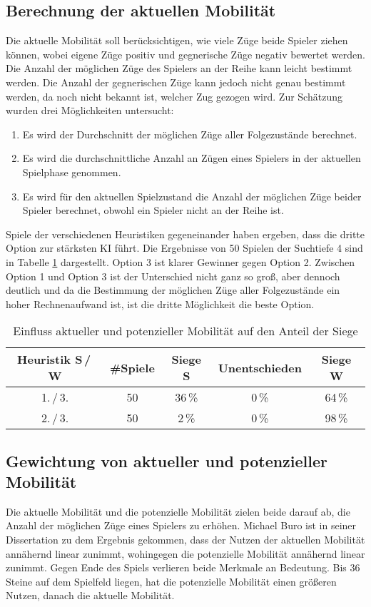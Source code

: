 \subsection{Berechnung der aktuellen Mobilität}
\label{sec:currentmobility}
Die aktuelle Mobilität soll berücksichtigen, wie viele Züge beide Spieler ziehen können, wobei eigene Züge positiv und
gegnerische Züge negativ bewertet werden. Die Anzahl der möglichen Züge des Spielers an der Reihe kann leicht bestimmt
werden. Die Anzahl der gegnerischen Züge kann jedoch nicht genau bestimmt werden, da noch nicht bekannt ist, welcher Zug
gezogen wird. Zur Schätzung wurden drei Möglichkeiten untersucht:
\begin{enumerate}
    \item Es wird der Durchschnitt der möglichen Züge aller Folgezustände berechnet.
    \item Es wird die durchschnittliche Anzahl an Zügen eines Spielers in der aktuellen Spielphase genommen.
    \item Es wird für den aktuellen Spielzustand die Anzahl der möglichen Züge beider Spieler berechnet, obwohl ein
    Spieler nicht an der Reihe ist.
\end{enumerate}
Spiele der verschiedenen Heuristiken gegeneinander haben ergeben, dass die dritte Option zur stärksten \ac{KI} führt. Die
Ergebnisse von 50 Spielen der Suchtiefe 4 sind in Tabelle \ref{table:currentmobility} dargestellt. Option 3 ist klarer
Gewinner gegen Option 2. Zwischen Option 1 und Option 3 ist der Unterschied nicht ganz so groß, aber dennoch deutlich
und da die Bestimmung der möglichen Züge aller Folgezustände ein hoher Rechnenaufwand ist, ist die dritte Möglichkeit
die beste Option.

\begin{table}[hb]
\centering
\begin{tabular}{c|c|ccc}
\hline
Heuristik S\,/\,W & \#Spiele & Siege S & Unentschieden & Siege W \\
\hline
 1.\,/\,3. & 50 & 36\,\% &  0\,\% & 64\,\% \\
 2.\,/\,3. & 50 &  2\,\% &  0\,\% & 98\,\% \\
\hline
\end{tabular}
\caption{Einfluss aktueller und potenzieller Mobilität auf den Anteil der Siege}
\label{table:currentmobility}
\end{table}

\subsection{Gewichtung von aktueller und potenzieller Mobilität}
\label{sec:combinedmobility}
Die aktuelle Mobilität und die potenzielle Mobilität zielen beide darauf ab, die Anzahl der möglichen Züge eines
Spielers zu erhöhen. Michael Buro ist in seiner Dissertation zu dem Ergebnis gekommen, dass der Nutzen der aktuellen
Mobilität annähernd linear zunimmt, wohingegen die potenzielle Mobilität annähernd linear zunimmt. Gegen Ende des Spiels
verlieren beide Merkmale an Bedeutung. Bis 36 Steine auf dem Spielfeld liegen, hat die potenzielle Mobilität einen
größeren Nutzen, danach die aktuelle Mobilität. \cite[S.~20]{evaluationfunctions}

